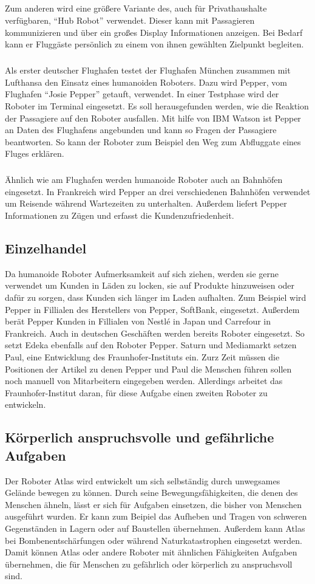 \subparagraph{}
Zum anderen wird eine größere Variante des, auch für Privathaushalte
verfügbaren, "`Hub Robot"' verwendet. Dieser kann mit Passagieren kommunizieren
und über ein großes Display Informationen anzeigen. Bei Bedarf kann er Fluggäste
persönlich zu einem von ihnen gewählten Zielpunkt begleiten.
\cite{Beineke2017}

\subparagraph{}
Als erster deutscher Flughafen testet der Flughafen München zusammen mit
Lufthansa den Einsatz eines humanoiden Roboters. Dazu wird Pepper, vom Flughafen
"`Josie Pepper"' getauft, verwendet. In einer Testphase wird der Roboter im
Terminal eingesetzt. Es soll herausgefunden werden, wie die Reaktion der
Passagiere auf den Roboter ausfallen. Mit hilfe von IBM Watson ist Pepper an
Daten des Flughafens angebunden und kann so Fragen der Passagiere beantworten.
So kann der Roboter zum Beispiel den Weg zum Abfluggate eines Fluges erklären.
\cite{MunichAirport2018}

\subparagraph{}
Ähnlich wie am Flughafen werden humanoide Roboter auch an Bahnhöfen eingesetzt.
In Frankreich wird Pepper an drei verschiedenen Bahnhöfen verwendet um Reisende
während Wartezeiten zu unterhalten. Außerdem liefert Pepper Informationen zu
Zügen und erfasst die Kundenzufriedenheit. \cite{SoftBankIV2018}

\subsection{Einzelhandel}
Da humanoide Roboter Aufmerksamkeit auf sich ziehen, werden sie gerne verwendet
um Kunden in Läden zu locken, sie auf Produkte hinzuweisen oder dafür zu sorgen,
dass Kunden sich länger im Laden aufhalten. Zum Beispiel wird Pepper in
Fillialen des Herstellers von Pepper, SoftBank, eingesetzt. Außerdem berät
Pepper Kunden in Fillialen von Nestlé in Japan und Carrefour in Frankreich.
\cite{SoftBankIV2018} Auch in deutschen Geschäften werden bereits Roboter
eingesetzt. So setzt Edeka ebenfalls auf den Roboter Pepper. Saturn und
Mediamarkt setzen Paul, eine Entwicklung des Fraunhofer-Instituts ein. Zurz Zeit
müssen die Positionen der Artikel zu denen Pepper und Paul die Menschen führen
sollen noch manuell von Mitarbeitern eingegeben werden. Allerdings arbeitet das
Fraunhofer-Institut daran, für diese Aufgabe einen zweiten Roboter zu
entwickeln. \cite{Hildebrand2017}

\subsection{Körperlich anspruchsvolle und gefährliche Aufgaben}
Der Roboter Atlas wird entwickelt um sich selbständig durch unwegsames Gelände
bewegen zu können. Durch seine Bewegungsfähigkeiten, die denen des Menschen
ähneln, lässt er sich für Aufgaben einsetzen, die bisher von Menschen ausgeführt
wurden. Er kann zum Beipiel das Aufheben
und Tragen von schweren Gegenständen in Lagern oder auf Baustellen übernehmen.
Außerdem kann Atlas bei Bombenentschärfungen oder während Naturkatastrophen
eingesetzt werden. Damit können Atlas oder andere Roboter mit ähnlichen
Fähigkeiten Aufgaben übernehmen, die für Menschen zu gefährlich oder körperlich
zu anspruchsvoll sind. \cite{Kaczmarek2016}
